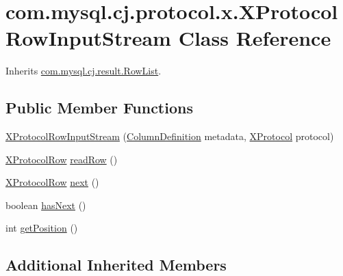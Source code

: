 \hypertarget{classcom_1_1mysql_1_1cj_1_1protocol_1_1x_1_1_x_protocol_row_input_stream}{}\section{com.\+mysql.\+cj.\+protocol.\+x.\+X\+Protocol\+Row\+Input\+Stream Class Reference}
\label{classcom_1_1mysql_1_1cj_1_1protocol_1_1x_1_1_x_protocol_row_input_stream}


Inherits \mbox{\hyperlink{interfacecom_1_1mysql_1_1cj_1_1result_1_1_row_list}{com.\+mysql.\+cj.\+result.\+Row\+List}}.

\subsection*{Public Member Functions}
\begin{DoxyCompactItemize}
\item 
\mbox{\hyperlink{classcom_1_1mysql_1_1cj_1_1protocol_1_1x_1_1_x_protocol_row_input_stream_acee97cd932c810fa6761e25d33d908d6}{X\+Protocol\+Row\+Input\+Stream}} (\mbox{\hyperlink{interfacecom_1_1mysql_1_1cj_1_1protocol_1_1_column_definition}{Column\+Definition}} metadata, \mbox{\hyperlink{classcom_1_1mysql_1_1cj_1_1protocol_1_1x_1_1_x_protocol}{X\+Protocol}} protocol)
\item 
\mbox{\hyperlink{classcom_1_1mysql_1_1cj_1_1protocol_1_1x_1_1_x_protocol_row}{X\+Protocol\+Row}} \mbox{\hyperlink{classcom_1_1mysql_1_1cj_1_1protocol_1_1x_1_1_x_protocol_row_input_stream_afef0e6619e835e11b0b3e2fb4b10edec}{read\+Row}} ()
\item 
\mbox{\hyperlink{classcom_1_1mysql_1_1cj_1_1protocol_1_1x_1_1_x_protocol_row}{X\+Protocol\+Row}} \mbox{\hyperlink{classcom_1_1mysql_1_1cj_1_1protocol_1_1x_1_1_x_protocol_row_input_stream_adaf699396a658535a997770a0214df52}{next}} ()
\item 
boolean \mbox{\hyperlink{classcom_1_1mysql_1_1cj_1_1protocol_1_1x_1_1_x_protocol_row_input_stream_a7304f867f5dcd4d089c8e286683c8d04}{has\+Next}} ()
\item 
int \mbox{\hyperlink{classcom_1_1mysql_1_1cj_1_1protocol_1_1x_1_1_x_protocol_row_input_stream_ae168f4e9360c0d78dcb34cd3e3842d7c}{get\+Position}} ()
\end{DoxyCompactItemize}
\subsection*{Additional Inherited Members}


